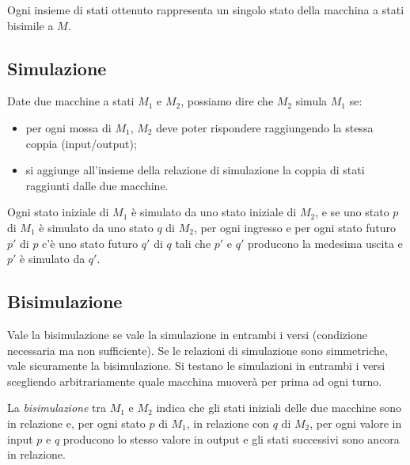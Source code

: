 \documentclass[a4paper, notitlepage, 10pt]{report}
\begin{document}
\noindent
Ogni insieme di stati ottenuto rappresenta un singolo stato della macchina a stati bisimile a $M$.


\subsection*{Simulazione}
Date due macchine a stati $M_1$ e $M_2$, possiamo dire che $M_2$ simula $M_1$ se:
\begin{itemize}
	\item per ogni mossa di $M_1$, $M_2$ deve poter rispondere raggiungendo la stessa coppia (input/output);
	\item si aggiunge all'insieme della relazione di simulazione la coppia di stati raggiunti dalle due macchine.
\end{itemize}

\noindent
Ogni stato iniziale di $M_1$ è simulato da uno stato iniziale di $M_2$, e se uno stato $p$ di $M_1$ è simulato da uno stato $q$ di $M_2$, per ogni ingresso e per ogni stato futuro $p'$ di $p$ c’è uno stato futuro $q'$ di $q$ tali che $p'$ e $q'$ producono la medesima uscita e $p'$ è simulato da $q'$.

\subsection*{Bisimulazione}
Vale la bisimulazione se vale la simulazione in entrambi i versi (condizione necessaria ma non sufficiente). Se le relazioni di simulazione sono simmetriche, vale sicuramente la bisimulazione. Si testano le simulazioni in entrambi i versi scegliendo arbitrariamente quale macchina muoverà per prima ad ogni turno.
\newline

\noindent
La \textit{bisimulazione} tra $M_1$ e $M_2$ indica che gli stati iniziali delle due macchine sono in relazione e, per ogni stato $p$ di $M_1$, in relazione con $q$ di $M_2$, per ogni valore in input $p$ e $q$ producono lo stesso valore in output e gli stati successivi sono ancora in relazione.
\end{document}
